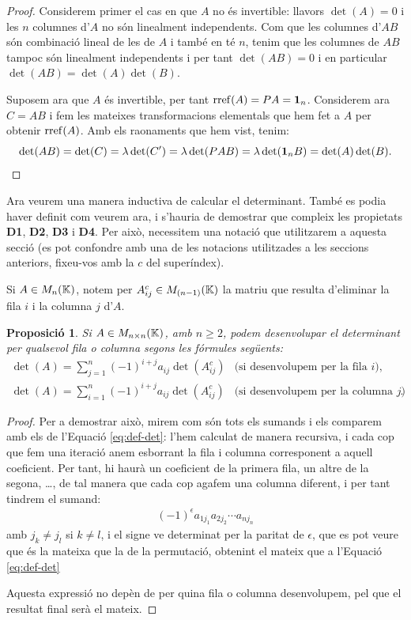 \documentclass[
  11pt,
]{book}
\numberwithin{dummy}{section}
\theoremstyle{maincolornumbox}
\theoremstyle{blacknumex}
\theoremstyle{blacknumbox}
\theoremstyle{maincolornum}
\newtheorem{propositionT}{Proposició}[chapter]
\newenvironment{proposition}{\begin{pBox}\begin{propositionT}}{\end{propositionT}\end{pBox}}
\newlength\esp
\begin{document}
\begin{proof}
Considerem primer el cas en que \(A\) no és invertible: llavors
\(\det(A)=0\) i les \(n\) columnes d'\(A\) no són linealment independents. Com
que les columnes d'\(AB\) són combinació lineal de les de \(A\) i també en
té \(n\), tenim que les columnes de \(AB\) tampoc són linealment
independents i per tant \(\det(AB)=0\) i en particular
\(\det(AB)=\det(A)\det(B)\).

Suposem ara que \(A\) és invertible, per tant \(\operatorname{rref}(A)=PA=\mathbf{1}_n\).
Considerem ara \(C=AB\) i fem les mateixes transformacions elementals que
hem fet a \(A\) per obtenir \(\operatorname{rref}(A)\). Amb els raonaments que hem vist,
tenim:
\[\det(AB)=\det(C)=\lambda \det(C')=\lambda \det(PAB)=\lambda \det(\mathbf{1}_n B)=\det(A)\det(B).\]
\end{proof}

Ara veurem una manera inductiva de calcular el determinant. També es
podia haver definit com veurem ara, i s'hauria de demostrar que compleix
les propietats \textbf{D1}, \textbf{D2}, \textbf{D3} i \textbf{D4}. Per això, necessitem una
notació que utilitzarem a aquesta secció (es pot confondre amb una de
les notacions utilitzades a les seccions anteriors, fixeu-vos amb la \(c\)
del superíndex).

Si \(A\in M_{n}(\mathbb{K})\), notem per \(A^c_{ij}\in M_{(n-1)}(\mathbb{K})\) la matriu que
resulta d'eliminar la fila \(i\) i la columna \(j\) d'\(A\).

\begin{proposition}
\protect\hypertarget{prp:defdet}{}\label{prp:defdet}Si \(A\in M_{n\times n}(\mathbb{K})\), amb
\(n\geq2\), podem desenvolupar el determinant per qualsevol fila o columna
segons les fórmules següents: \[\begin{array}{ll}
    \det(A)=\sum_{j=1}^n (-1)^{i+j} a_{ij} \det(A^c_{ij}) & \text{(si desenvolupem per la fila $i$)},\\[3mm]
    \det(A)=\sum_{i=1}^n (-1)^{i+j} a_{ij} \det(A^c_{ij}) & \text{(si desenvolupem per la columna $j$)}.
    \end{array}\]
\end{proposition}

\begin{proof}
Per a demostrar això, mirem com són tots els sumands i els
comparem amb els de l'Equació
\eqref{eq:def-det}: l'hem calculat de manera recursiva, i cada cop
que fem una iteració anem esborrant la fila i columna corresponent a
aquell coeficient. Per tant, hi haurà un coeficient de la primera fila,
un altre de la segona, \ldots, de tal manera que cada cop agafem una
columna diferent, i per tant tindrem el sumand: \begin{align*}
\label{eq:sumanddet}
    (-1)^\epsilon a_{1j_1} a_{2j_2} \cdots a_{nj_n}
\end{align*} amb \(j_k\neq j_l\) si \(k\neq l\), i el signe ve determinat
per la paritat de \(\epsilon\), que es pot veure que és la mateixa que la
de la permutació, obtenint el mateix que a l'Equació
\eqref{eq:def-det}

Aquesta expressió no depèn de per quina fila o columna desenvolupem, pel
que el resultat final serà el mateix.
\end{proof}
\end{document}
